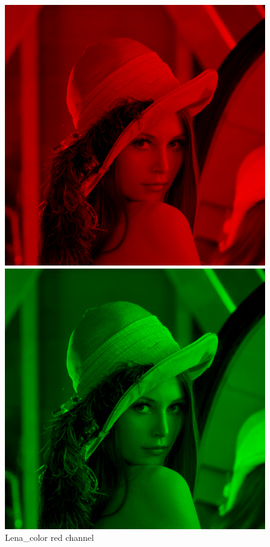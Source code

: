 \begin{figure}[h]
	\centering
	\begin{minipage}{0.45\textwidth}
		\centering
		\includegraphics[width=\linewidth]{images/source/task4/1/1}
		\caption{Lena\_color red channel}
		\label{fig:1a}
        \end{minipage}
        \hspace{0.05\textwidth}
        \begin{minipage}{0.45\textwidth}
        		\centering
		\includegraphics[width=\linewidth]{images/source/task4/1/2}

\end{minipage}
\end{figure}
